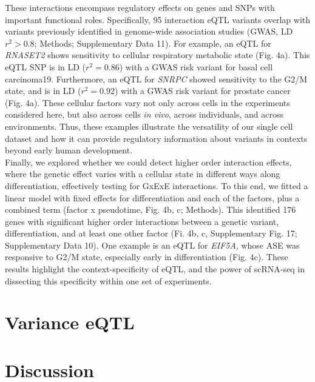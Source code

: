 These interactions encompass regulatory effects on genes and SNPs with important functional roles. Specifically, 95 interaction eQTL variants overlap with variants previously identified in genome-wide association studies (GWAS, LD $r^2>0.8$; Methods; Supplementary Data 11). 
For example, an eQTL for \textit{RNASET2} shows sensitivity to cellular respiratory metabolic state (Fig. 4a). 
This eQTL SNP is in LD ($r^2=0.86$) with a GWAS risk variant for basal cell carcinoma19. Furthermore, an eQTL for \textit{SNRPC} showed sensitivity to the G2/M state, and is in LD ($r^2=0.92$) with a GWAS risk variant for prostate cancer (Fig. 4a). 
These cellular factors vary not only across cells in the experiments considered here, but also across cells \textit{in vivo}, across individuals, and across environments. 
Thus, these examples illustrate the versatility of our single cell dataset and how it can provide regulatory information about variants in contexts beyond early human development.\\

Finally, we explored whether we could detect higher order interaction effects, where the genetic effect varies with a cellular state in different ways along differentiation, effectively testing for GxExE interactions. 
To this end, we fitted a linear model with fixed effects for differentiation and each of the factors, plus a combined term (factor x pseudotime, Fig. 4b, c; Methods). 
This identified 176 genes with significant higher order interactions between a genetic variant, differentiation, and at least one other factor (Fi. 4b, c, Supplementary Fig. 17; Supplementary Data 10). 
One example is an eQTL for \textit{EIF5A}, whose ASE was responsive to G2/M state, especially early in differentiation (Fig. 4c). 
These results highlight the context-specificity of eQTL, and the power of scRNA-seq in dissecting this specificity within one set of experiments.

\newpage

\section{Variance eQTL}

\section{Discussion}